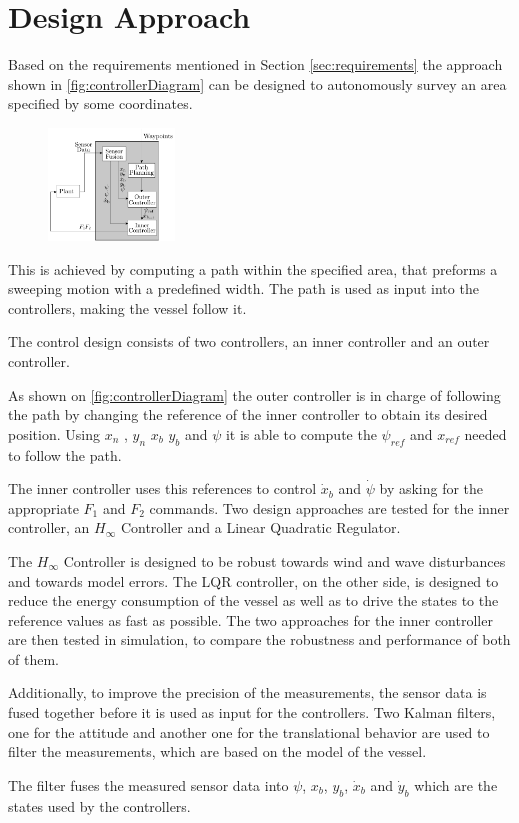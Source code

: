 \chapter{Design Approach} \label{chap:designaproach}
Based on the requirements mentioned in Section \ref{sec:requirements} the approach shown in \autoref{fig:controllerDiagram} can be designed to autonomously survey an area specified by some coordinates.
\begin{figure}[H]
    \includegraphics[width=0.3\textwidth]{figures/controllerDiagram2}
    \caption{}
    \label{fig:controllerDiagram}
\end{figure}
This is achieved by computing a path within the specified area, that preforms a sweeping motion with a predefined width. The path is used as input into the controllers, making the vessel follow it. 

The control design consists of two controllers, an inner controller and an outer controller. 

As shown on \autoref{fig:controllerDiagram} the outer controller is in charge of following the path by changing the reference of the inner controller to obtain its desired position. Using $x_{n}$ , $y_{n}$ $x_b$ $y_b$ and $\psi$ it is able to compute the $\psi_{ref}$ and $x_{ref}$ needed to follow the path. 

The inner controller uses this references to control $\dot{x}_{b}$ and $\dot{\psi}$ by asking for the appropriate $F_{1}$ and $F_{2}$ commands. Two design approaches are tested for the inner controller, an $H_{\infty}$ Controller and a Linear Quadratic Regulator.

The $H_{\infty}$ Controller is designed to be robust towards wind and wave disturbances and towards model errors. The LQR controller, on the other side, is designed to reduce the energy consumption of the vessel as well as to drive the states to the reference values as fast as possible. 
The two approaches for the inner controller are then tested in simulation, to compare the robustness and performance of both of them. 

Additionally, to improve the precision of the measurements, the sensor data is fused together before it is used as input for the controllers. Two Kalman filters, one for the attitude and another one for the translational behavior are used to filter the measurements, which are based on the model of the vessel. 
 
The filter fuses the measured sensor data into $\psi$, $x_{b}$, $y_{b}$, $\dot{x}_{b}$ and $\dot{y}_{b}$ which are the states used by the controllers. 

